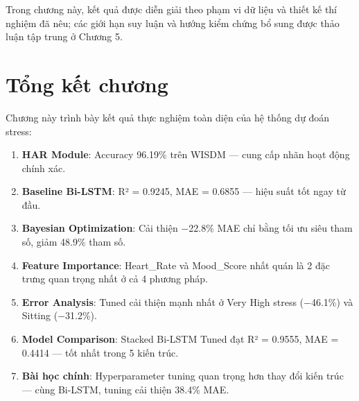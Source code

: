 Trong chương này, kết quả được diễn giải theo phạm vi dữ liệu và thiết kế thí nghiệm đã nêu; các giới hạn suy luận và hướng kiểm chứng bổ sung được thảo luận tập trung ở Chương 5.


\section{Tổng kết chương}
\label{sec:chapter4_summary}

Chương này trình bày kết quả thực nghiệm toàn diện của hệ thống dự đoán stress:

\begin{enumerate}
    \item \textbf{HAR Module}: Accuracy 96.19\% trên WISDM — cung cấp nhãn hoạt động chính xác.
    \item \textbf{Baseline Bi-LSTM}: R² = 0.9245, MAE = 0.6855 — hiệu suất tốt ngay từ đầu.
    \item \textbf{Bayesian Optimization}: Cải thiện $-$22.8\% MAE chỉ bằng tối ưu siêu tham số, giảm 48.9\% tham số.
    \item \textbf{Feature Importance}: Heart\_Rate và Mood\_Score nhất quán là 2 đặc trưng quan trọng nhất ở cả 4 phương pháp.
    \item \textbf{Error Analysis}: Tuned cải thiện mạnh nhất ở Very High stress ($-$46.1\%) và Sitting ($-$31.2\%).
    \item \textbf{Model Comparison}: Stacked Bi-LSTM Tuned đạt R² = 0.9555, MAE = 0.4414 — tốt nhất trong 5 kiến trúc.
    \item \textbf{Bài học chính}: Hyperparameter tuning quan trọng hơn thay đổi kiến trúc — cùng Bi-LSTM, tuning cải thiện 38.4\% MAE.
\end{enumerate}
